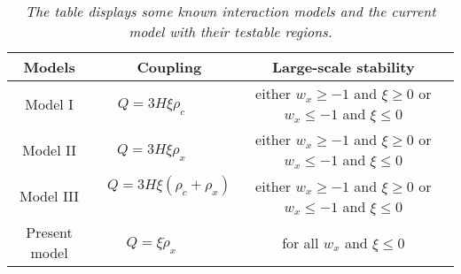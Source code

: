 \documentclass[superscriptaddress,oneolumn,secnumarabic,
amssymb,amsmath,nobibnotes,aps,prd,showpacs,nofootinbib]{revtex4}%
\begin{document}
\begin{table}
\begin{center}
\caption{\textit{The table displays some known interaction models and the current model with their testable regions.} }
\label{table:coupling}
\begin{tabular}{cccc}
\hline
\hline
Models &  Coupling  & Large-scale stability\\
\hline
Model I    &  $Q= 3 H \xi \rho_{c}$~~~~~& either $w_x\geq -1$ and $\xi \geq 0$ or $w_x\leq -1$ and $\xi \leq 0$\\
Model II   &  $Q= 3 H \xi \rho_{x}$~~~~~& either $w_x\geq -1$ and $\xi \geq 0$ or $w_x\leq -1$ and $\xi \leq 0$\\
Model III  &  $Q = 3 H \xi (\rho_{c}+\rho_{x})$~~~~~& either $w_x\geq -1$ and $\xi \geq 0$ or $w_x\leq -1$ and $\xi \leq 0$\\
Present model & $Q = \xi \dot{\rho}_x$~~~~~& for all $w_x$ and $\xi \leq 0$\\
\hline
\end{tabular}
\end{center}
\end{table}
\end{document}
